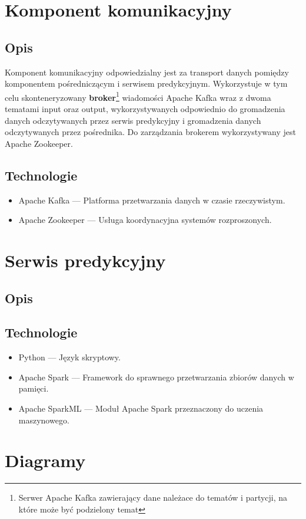 \documentclass[12pt, a4paper]{report}
\begin{document}
\chapter{Komponent komunikacyjny}
\section{Opis}
Komponent komunikacyjny odpowiedzialny jest za transport danych pomiędzy komponentem pośredniczącym i serwisem predykcyjnym.
Wykorzystuje w tym celu skonteneryzowany \textbf{broker}\footnote{Serwer Apache Kafka zawierający dane należace do tematów i partycji, na które może być podzielony temat}
wiadomości Apache Kafka wraz z dwoma tematami input oraz output, wykorzystywanych
odpowiednio do gromadzenia danych odczytywanych przez serwis predykcyjny i gromadzenia danych odczytywanych przez pośrednika.
Do zarządzania brokerem wykorzystywany jest Apache Zookeeper.
\section{Technologie}
\begin{itemize}
    \item Apache Kafka --- Platforma przetwarzania danych w czasie rzeczywistym.
    \item Apache Zookeeper --- Usługa koordynacyjna systemów rozproszonych.
\end{itemize}


\chapter{Serwis predykcyjny}
\section{Opis}
\section{Technologie}
\begin{itemize}
    \item Python --- Język skryptowy. 
    \item Apache Spark --- Framework do sprawnego przetwarzania zbiorów danych w pamięci.
    \item Apache SparkML --- Moduł Apache Spark przeznaczony do uczenia maszynowego.
\end{itemize}


\chapter{Diagramy}
\end{document}
